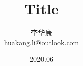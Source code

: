 \documentclass{ctexart}
\numberwithin{equation}{section}
\begin{document}
\title{\heiti Title}    
\author{\kaishu 李华康 \\huakang.li@outlook.com}  
\date{2020.06}
\maketitle


\end{document}

